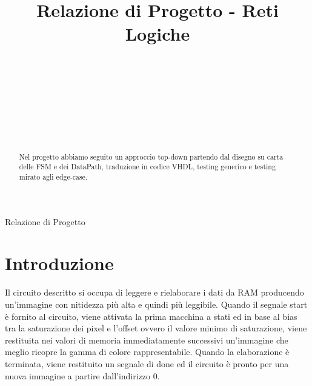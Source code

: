 \documentclass{article}
\begin{document}
\title{Relazione di Progetto - Reti Logiche%
%
}

\author{\\[2pt] 
\\
\\
\and
\\
\\
\\
}

%
%
{Relazione di Progetto} 

\maketitle

\begin{abstract}
Nel progetto abbiamo seguito un approccio top-down partendo dal disegno su carta delle FSM e dei DataPath, traduzione in codice VHDL, testing generico e testing mirato agli edge-case.
\end{abstract}


\section{Introduzione}
\label{intro}
Il circuito descritto si occupa di leggere e rielaborare i dati da RAM producendo un'immagine con nitidezza più alta e quindi più leggibile. 
Quando il segnale start è fornito al circuito, viene attivata la prima macchina a stati ed in base al bias tra la saturazione dei pixel e l'offset ovvero il valore minimo di saturazione, viene restituita nei valori di memoria immediatamente successivi un'immagine che meglio ricopre la gamma di colore rappresentabile.
Quando la elaborazione è terminata, viene restituito un segnale di done ed il circuito è pronto per una nuova immagine a partire dall'indirizzo 0.
\end{document}
